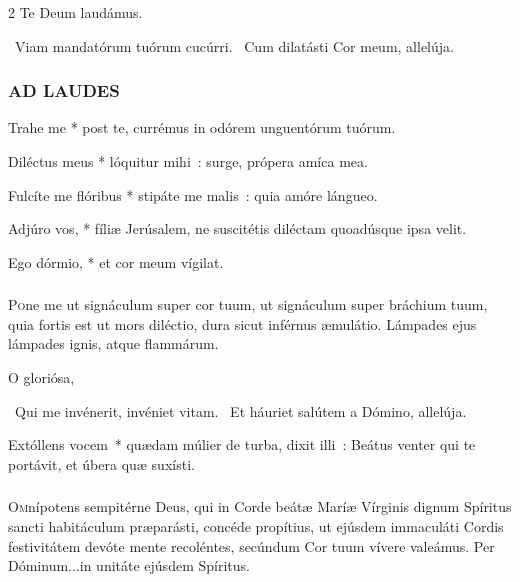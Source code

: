 \documentclass[9pt,twoside]{extarticle}
\begin{document}
\begin{multicols}{2}
Te Deum laudámus. %

~Viam mandatórum tuórum cucúrri. ~Cum dilatásti Cor meum, allelúja.

\subsubsection*{\center \normalfont \textsc{AD LAUDES}\\ \normalfont {}}

\smallskip
\indent {} Trahe me * post te, currémus in odórem unguentórum tuórum.

{\small {}}

 Diléctus meus * lóquitur mihi~: surge, própera amíca mea.

 Fulcíte me flóribus * stipáte me malis~: quia amóre lángueo.

 Adjúro vos, * fíliæ Jerúsalem, ne suscitétis diléctam quoadúsque ipsa velit.

 Ego dórmio, * et cor meum vígilat.


\subsubsection*{\normalfont {}}
\lettrine{P}{o}ne me ut signáculum super cor tuum, ut signáculum super bráchium tuum, quia fortis est ut mors diléctio, dura sicut inférnus æmulátio. Lámpades ejus lámpades ignis, atque flammárum.

\smallskip
{\small {} O gloriósa, }

~Qui me invénerit, invéniet vitam. ~Et háuriet salútem a Dómino, allelúja.

 Extóllens vocem~* quædam múlier de turba, dixit illi~: Beátus venter qui te portávit, et úbera quæ suxísti.

\subsubsection*{\center \normalfont {}}
\lettrine{O}{m}nípotens sempitérne Deus, qui in Corde beátæ Maríæ Vírginis dignum Spíritus sancti habitáculum præparásti, concéde propítius, ut ejúsdem immaculáti Cordis festivitátem devóte mente recoléntes, secúndum Cor tuum vívere valeámus. Per Dóminum...in unitáte ejúsdem Spíritus.


\end{multicols}
\end{document}
